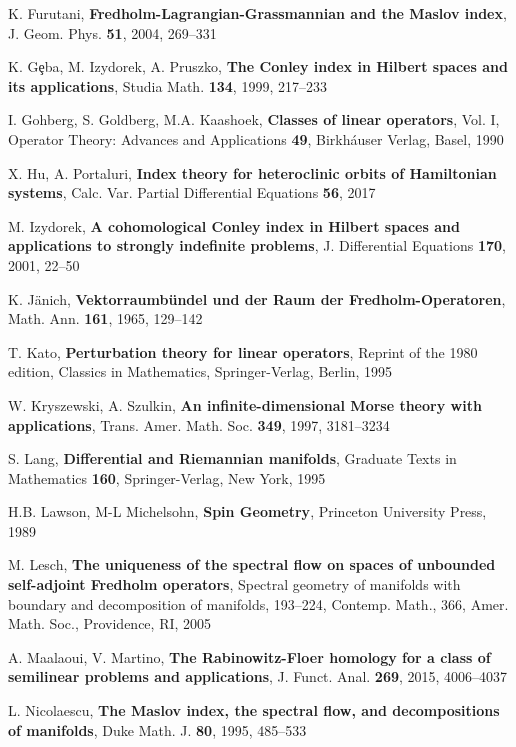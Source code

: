 \documentclass[a4paper,10pt]{article}
\begin{document}
 K. Furutani, \textbf{Fredholm-Lagrangian-Grassmannian and the Maslov index}, J. Geom. Phys. \textbf{51}, 2004, 269--331

 K. G\c{e}ba, M. Izydorek, A. Pruszko, \textbf{The Conley index in Hilbert spaces and its applications}, Studia Math. \textbf{134}, 1999, 217--233

 I. Gohberg, S. Goldberg, M.A. Kaashoek, \textbf{Classes of linear operators}, Vol. I,
Operator Theory: Advances and Applications \textbf{49}, Birkh\'{a}user Verlag, Basel, 1990

 X. Hu, A. Portaluri, \textbf{Index theory for heteroclinic orbits of Hamiltonian systems}, Calc. Var. Partial Differential Equations  \textbf{56}, 2017

 M. Izydorek, \textbf{A cohomological Conley index in Hilbert spaces and applications to strongly indefinite problems}, J. Differential Equations \textbf{170}, 2001, 22--50

 K. J\"anich, \textbf{Vektorraumb\"undel und der Raum der Fredholm-Operatoren}, Math. Ann. \textbf{161}, 1965, 129--142

 T. Kato, \textbf{Perturbation theory for linear operators}, Reprint of the 1980 edition, Classics in Mathematics, Springer-Verlag, Berlin,  1995

 W. Kryszewski, A. Szulkin, \textbf{An infinite-dimensional Morse theory with applications},  Trans. Amer. Math. Soc. \textbf{349}, 1997, 3181--3234

 S. Lang, \textbf{Differential and Riemannian manifolds}, Graduate Texts in Mathematics \textbf{160}, Springer-Verlag, New York, 1995

 H.B. Lawson, M-L Michelsohn, \textbf{Spin Geometry}, Princeton University Press, 1989

 M. Lesch, \textbf{The uniqueness of the spectral flow on spaces of unbounded self-adjoint Fredholm operators}, Spectral geometry of manifolds with boundary and decomposition of manifolds, 193--224, Contemp. Math., 366, Amer. Math. Soc., Providence, RI,  2005

 A. Maalaoui, V. Martino, \textbf{The Rabinowitz-Floer homology for a class of semilinear problems and applications}, J. Funct. Anal. \textbf{269}, 2015, 4006--4037

 L. Nicolaescu, \textbf{The Maslov index, the spectral flow, and decompositions of manifolds}, Duke Math. J. \textbf{80}, 1995, 485--533
\end{document}
